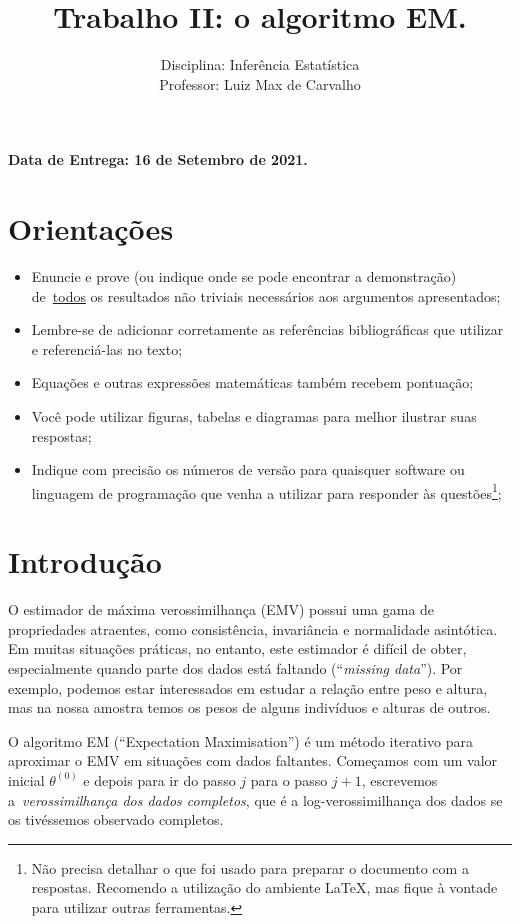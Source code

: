 \documentclass[a4paper,10pt, notitlepage]{report}
\title{Trabalho II: o algoritmo EM.}
\author{Disciplina: Inferência Estatística \\ Professor: Luiz Max de Carvalho}
\begin{document}
\maketitle

\textbf{Data de Entrega: 16 de Setembro de 2021.}

\section*{Orientações}
\begin{itemize}
 \item Enuncie e prove (ou indique onde se pode encontrar a demonstração) de~\underline{todos} os resultados não triviais necessários aos argumentos apresentados;
 \item Lembre-se de adicionar corretamente as referências bibliográficas que utilizar e referenciá-las no texto;
 \item Equações e outras expressões matemáticas também recebem pontuação;
 \item Você pode utilizar figuras, tabelas e diagramas para melhor ilustrar suas respostas;
 \item Indique com precisão os números de versão para quaisquer software ou linguagem de programação que venha a utilizar para responder às questões\footnote{Não precisa detalhar o que foi usado para preparar o documento com a respostas. Recomendo a utilização do ambiente LaTeX, mas fique à vontade para utilizar outras ferramentas.};
 \end{itemize}


\section*{Introdução}

O estimador de máxima verossimilhança (EMV) possui uma gama de propriedades atraentes, como consistência, invariância e normalidade asintótica.
Em muitas situações práticas, no entanto, este estimador é difícil de obter, especialmente quando parte dos dados está faltando (``\textit{missing data}'').
Por exemplo, podemos estar interessados em estudar a relação entre peso e altura, mas na nossa amostra temos os pesos de alguns indivíduos e alturas de outros.

O algoritmo EM (``Expectation Maximisation'') é um método iterativo para aproximar o EMV em situações com dados faltantes.
Começamos com um valor inicial $\theta^{(0)}$ e depois para ir do passo $j$ para o passo $j + 1$, escrevemos a~\textit{verossimilhança dos dados completos}, que é a log-verossimilhança dos dados se os tivéssemos observado completos.
\end{document}
